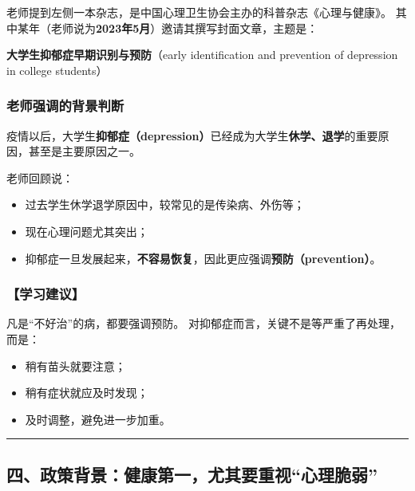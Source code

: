 \documentclass[
  chinese,
  9pt,
  a4paper,
]{ctexart}
\providecommand{\tightlist}{%
  \setlength{\itemsep}{0pt}\setlength{\parskip}{0pt}}
\begin{document}
老师提到左侧一本杂志，是中国心理卫生协会主办的科普杂志《心理与健康》。
其中某年（老师说为\textbf{2023年5月}）邀请其撰写封面文章，主题是：

\textbf{大学生抑郁症早期识别与预防}（early identification and prevention
of depression in college students）

\subsubsection{老师强调的背景判断}\label{ux8001ux5e08ux5f3aux8c03ux7684ux80ccux666fux5224ux65ad}

疫情以后，大学生\textbf{抑郁症（depression）}已经成为大学生\textbf{休学、退学}的重要原因，甚至是主要原因之一。

老师回顾说：

\begin{itemize}
\tightlist
\item
  过去学生休学退学原因中，较常见的是传染病、外伤等；
\item
  现在心理问题尤其突出；
\item
  抑郁症一旦发展起来，\textbf{不容易恢复}，因此更应强调\textbf{预防（prevention）}。
\end{itemize}

\subsubsection{【学习建议】}\label{ux5b66ux4e60ux5efaux8bae}

凡是``不好治''的病，都要强调预防。
对抑郁症而言，关键不是等严重了再处理，而是：

\begin{itemize}
\tightlist
\item
  稍有苗头就要注意；
\item
  稍有症状就应及时发现；
\item
  及时调整，避免进一步加重。
\end{itemize}

\begin{center}\rule{0.5\linewidth}{0.5pt}\end{center}

\subsection{四、政策背景：健康第一，尤其要重视``心理脆弱''}\label{ux56dbux653fux7b56ux80ccux666fux5065ux5eb7ux7b2cux4e00ux5c24ux5176ux8981ux91cdux89c6ux5fc3ux7406ux8106ux5f31}
\end{document}
